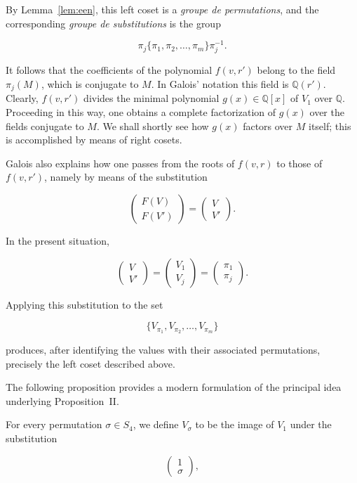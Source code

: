 \documentclass[a4paper,11pt]{article}
\begin{document}
By Lemma~\ref{lem:een}, this left coset is a \textit{groupe de permutations}, and the corresponding \textit{groupe de substitutions} is the group

\[
\pi_j\{\pi_1,\pi_2,\dots,\pi_m\}\pi_j^{-1}.
\]

It follows that the coefficients of the polynomial \(f(v,r')\) belong to the field \(\pi_j(M)\), which is conjugate to \(M\). In Galois' notation this field is \(\mathbb{Q}(r')\). Clearly, \(f(v,r')\) divides the minimal polynomial \(g(x)\in\mathbb{Q}[x]\) of \(V_1\) over \(\mathbb{Q}\). Proceeding in this way, one obtains a complete factorization of \(g(x)\) over the fields conjugate to \(M\). We shall shortly see how \(g(x)\) factors over \(M\) itself; this is accomplished by means of right cosets.

Galois also explains how one passes from the roots of \(f(v,r)\) to those of \(f(v,r')\), namely by means of the substitution

\[
\begin{pmatrix}
F(V)\\
F(V')
\end{pmatrix}
=
\begin{pmatrix}
V\\
V'
\end{pmatrix}.
\]

In the present situation,

\[
\begin{pmatrix}
V\\
V'
\end{pmatrix}
=
\begin{pmatrix}
V_1\\
V_j
\end{pmatrix}
=
\begin{pmatrix}
\pi_1\\
\pi_j
\end{pmatrix}.
\]

Applying this substitution to the set

\[
\{V_{\pi_1},V_{\pi_2},\dots,V_{\pi_m}\}
\]

produces, after identifying the values with their associated permutations, precisely the left coset described above.

The following proposition provides a modern formulation of the principal idea underlying Proposition~II.

For every permutation \(\sigma\in S_4\), we define \(V_\sigma\) to be the image of \(V_1\) under the substitution

\[
\begin{pmatrix}
1\\
\sigma
\end{pmatrix},
\]
\end{document}
